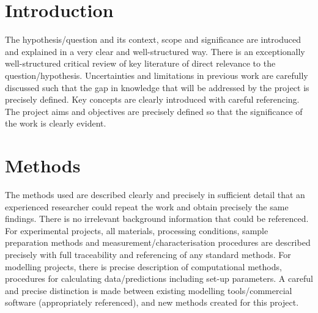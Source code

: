 \documentclass{Academic}
\begin{document}
\myabstract{}
\renewcommand{\myTitle}{Title of Paper Here}
\renewcommand{\MyAuthor}{Your Name Here}
\renewcommand{\MyDepartment}{Department Here}
\renewcommand{\MyCourse}{Course Name Here}
\renewcommand{\ID}{1234567}
\renewcommand{\Keywords}{Keyword 1, Keyword 2, Keyword 3}
\maketitle
\par
\onehalfspacing

\section{Introduction}

The hypothesis/question and its context, scope and significance are introduced and explained in a very clear and well-structured way\supercite{einstein}. 
There is an exceptionally well-structured critical review of key literature of direct relevance to the question/hypothesis. Uncertainties and limitations in previous work are carefully discussed such that the gap in knowledge that will be addressed by the project is precisely defined. 
Key concepts are clearly introduced with careful referencing. 
The project aims and objectives are precisely defined so that the significance of the work is clearly evident.

\section{Methods}

The methods used are described clearly and precisely in sufficient detail that an experienced researcher could repeat the work and obtain precisely the same findings. There is no irrelevant background information that could be referenced.
For experimental projects, all materials, processing conditions, sample preparation methods and measurement/characterisation procedures are described precisely with full traceability and referencing of any standard methods.
 For modelling projects, there is precise description of computational methods, procedures for calculating data/predictions including set-up parameters. A careful and precise distinction is made between existing modelling tools/commercial software (appropriately referenced), and new methods created for this project. 
\end{document}
